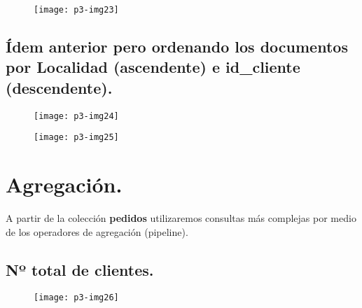 \documentclass[10pt]{article}
\begin{document}
 \begin{figure}[H]
	\begin{center}
 		\texttt{[image: p3-img23]}
	\end{center} 
\end{figure}

\subsection{Ídem anterior pero ordenando los documentos por Localidad (ascendente) e \textbf{id\_cliente} (descendente).}

 \begin{figure}[H]
	\begin{center}
 		\texttt{[image: p3-img24]}
	\end{center} 
\end{figure}

\begin{figure}[H]
	\begin{center}
 		\texttt{[image: p3-img25]}
	\end{center} 
\end{figure}



\section{Agregación.} 

A partir de la colección \textbf{pedidos} utilizaremos consultas más complejas por medio de los operadores de agregación (pipeline). 

\subsection{Nº total de clientes.}

\begin{figure}[H]
	\begin{center}
 		\texttt{[image: p3-img26]}
	\end{center} 
\end{figure}
\end{document}
